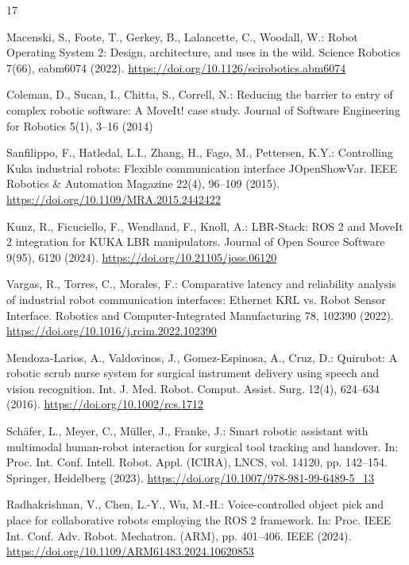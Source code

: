 \documentclass{svproc}
\begin{document}
\begin{thebibliography}{17}

Macenski, S., Foote, T., Gerkey, B., Lalancette, C., Woodall, W.: Robot Operating System 2: Design, architecture, and uses in the wild. Science Robotics 7(66), eabm6074 (2022). \url{https://doi.org/10.1126/scirobotics.abm6074}

Coleman, D., Sucan, I., Chitta, S., Correll, N.: Reducing the barrier to entry of complex robotic software: A MoveIt! case study. Journal of Software Engineering for Robotics 5(1), 3--16 (2014)

Sanfilippo, F., Hatledal, L.I., Zhang, H., Fago, M., Pettersen, K.Y.: Controlling Kuka industrial robots: Flexible communication interface JOpenShowVar. IEEE Robotics \& Automation Magazine 22(4), 96--109 (2015). \url{https://doi.org/10.1109/MRA.2015.2442422}

Kunz, R., Ficuciello, F., Wendland, F., Knoll, A.: LBR-Stack: ROS 2 and MoveIt 2 integration for KUKA LBR manipulators. Journal of Open Source Software 9(95), 6120 (2024). \url{https://doi.org/10.21105/joss.06120}

Vargas, R., Torres, C., Morales, F.: Comparative latency and reliability analysis of industrial robot communication interfaces: Ethernet KRL vs. Robot Sensor Interface. Robotics and Computer-Integrated Manufacturing 78, 102390 (2022). \url{https://doi.org/10.1016/j.rcim.2022.102390}

Mendoza-Larios, A., Valdovinos, J., Gomez-Espinosa, A., Cruz, D.: Quirubot: A robotic scrub nurse system for surgical instrument delivery using speech and vision recognition. Int. J. Med. Robot. Comput. Assist. Surg. 12(4), 624--634 (2016). \url{https://doi.org/10.1002/rcs.1712}

Sch{\"a}fer, L., Meyer, C., M{\"u}ller, J., Franke, J.: Smart robotic assistant with multimodal human-robot interaction for surgical tool tracking and handover. In: Proc. Int. Conf. Intell. Robot. Appl. (ICIRA), LNCS, vol. 14120, pp. 142--154. Springer, Heidelberg (2023). \url{https://doi.org/10.1007/978-981-99-6489-5_13}

Radhakrishnan, V., Chen, L.-Y., Wu, M.-H.: Voice-controlled object pick and place for collaborative robots employing the ROS 2 framework. In: Proc. IEEE Int. Conf. Adv. Robot. Mechatron. (ARM), pp. 401--406. IEEE (2024). \url{https://doi.org/10.1109/ARM61483.2024.10620853}


\end{thebibliography}
\end{document}
